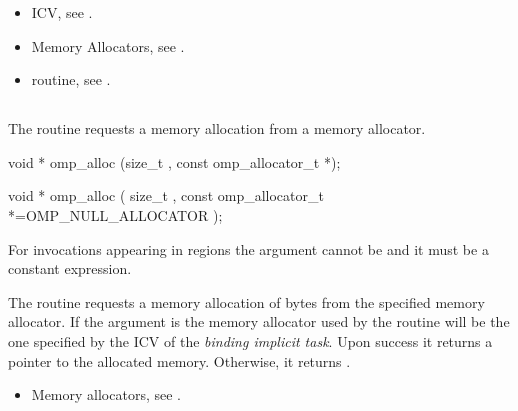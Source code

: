 \crossreferences
\begin{itemize}
\item {} ICV, see .
\item Memory Allocators, see .
\item {} routine, see .
\end{itemize}


\newpage %
\vspace{3\baselineskip}
\ccppspecificstart
\vspace{-3\baselineskip}
\subsection{}
\label{subsec:omp_alloc}

\summary
The  routine requests a memory allocation from a memory allocator.

\format
\begin{cspecific}
\begin{ompcFunction}
void * omp_alloc (size_t , const omp_allocator_t *);
\end{ompcFunction}
\end{cspecific}
\begin{cppspecific}
\begin{ompcFunction}
void * omp_alloc (
  size_t ,
  const omp_allocator_t *=OMP_NULL_ALLOCATOR
);
\end{ompcFunction}
\end{cppspecific}

\constraints

For  invocations appearing in  regions the  argument cannot be  and it must be a constant expression.

\effect

The  routine requests a memory allocation of  bytes from the specified memory allocator. If the  argument is 
 the memory allocator used by the routine will be the one specified by the  ICV of the \emph{binding implicit task}.
Upon success it returns a pointer to the allocated memory. Otherwise, it returns .

\crossreferences
\begin{itemize}
\item Memory allocators, see .
\end{itemize}

